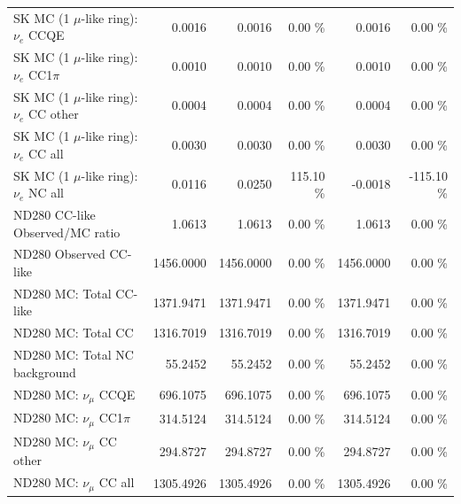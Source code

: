 \begin{table}
\begin{tabular}{| l | r | r  r | r  r |}
                             SK MC (1 $\mu$-like ring): $\nu_{e}$ CCQE &          0.0016 &          0.0016 &  0.00 \%  &          0.0016 &  0.00 \%  \\ 
                         SK MC (1 $\mu$-like ring): $\nu_{e}$ CC1$\pi$ &          0.0010 &          0.0010 &  0.00 \%  &          0.0010 &  0.00 \%  \\ 
                         SK MC (1 $\mu$-like ring): $\nu_{e}$ CC other &          0.0004 &          0.0004 &  0.00 \%  &          0.0004 &  0.00 \%  \\ 
                           SK MC (1 $\mu$-like ring): $\nu_{e}$ CC all &          0.0030 &          0.0030 &  0.00 \%  &          0.0030 &  0.00 \%  \\ 
                           SK MC (1 $\mu$-like ring): $\nu_{e}$ NC all &          0.0116 &          0.0250 & 115.10 \%  &         -0.0018 & -115.10 \%  \\ 
\hline
                                       ND280 CC-like Observed/MC ratio &          1.0613 &          1.0613 &  0.00 \%  &          1.0613 &  0.00 \%  \\ 
                                                ND280 Observed CC-like &       1456.0000 &       1456.0000 &  0.00 \%  &       1456.0000 &  0.00 \%  \\ 
                                               ND280 MC: Total CC-like &       1371.9471 &       1371.9471 &  0.00 \%  &       1371.9471 &  0.00 \%  \\ 
                                                    ND280 MC: Total CC &       1316.7019 &       1316.7019 &  0.00 \%  &       1316.7019 &  0.00 \%  \\ 
                                         ND280 MC: Total NC background &         55.2452 &         55.2452 &  0.00 \%  &         55.2452 &  0.00 \%  \\ 
\hline
                                            ND280 MC: $\nu_{\mu}$ CCQE &        696.1075 &        696.1075 &  0.00 \%  &        696.1075 &  0.00 \%  \\ 
                                        ND280 MC: $\nu_{\mu}$ CC1$\pi$ &        314.5124 &        314.5124 &  0.00 \%  &        314.5124 &  0.00 \%  \\ 
                                        ND280 MC: $\nu_{\mu}$ CC other &        294.8727 &        294.8727 &  0.00 \%  &        294.8727 &  0.00 \%  \\ 
                                          ND280 MC: $\nu_{\mu}$ CC all &       1305.4926 &       1305.4926 &  0.00 \%  &       1305.4926 &  0.00 \%  \\ 

\end{tabular}
\end{table}
